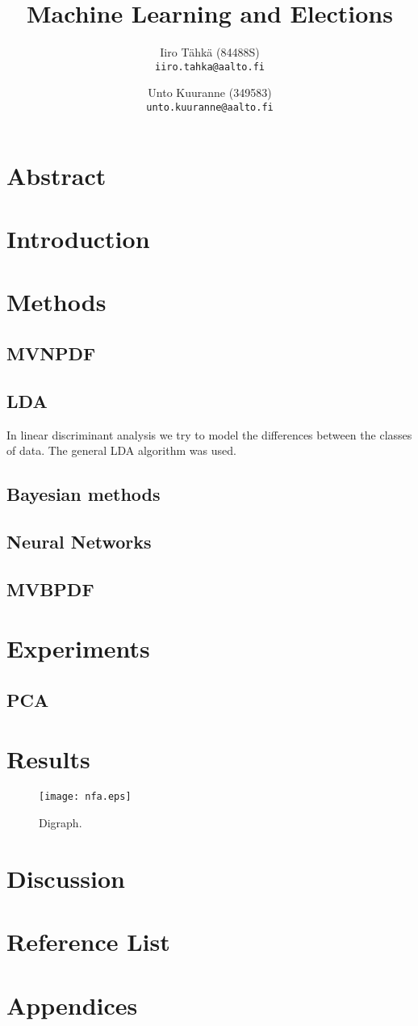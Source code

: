 \documentclass[a4paper,10pt]{article}
\title{Machine Learning and Elections}
\author{
        Iiro Tähkä (84488S)\\ 
       {\tt iiro.tahka@aalto.fi}
        \and          
        Unto Kuuranne (349583)\\ 
       {\tt unto.kuuranne@aalto.fi}
}
\begin{document}
\maketitle

\section{Abstract}


\section{Introduction}
\section{Methods}
\subsection{MVNPDF}
\subsection{LDA}
In linear discriminant analysis we try to model the differences between the 
classes of data. The general LDA algorithm was used.
\subsection{Bayesian methods}
\subsection{Neural Networks}
\subsection{MVBPDF}
\section{Experiments}
\subsection{PCA}
\section{Results}
\begin{figure}[!htb]
\centering
\texttt{[image: nfa.eps]}
\caption{Digraph.}
\label{fig:digraph}
\end{figure}
\section{Discussion}
\section{Reference List}
\section{Appendices}
\end{document}

